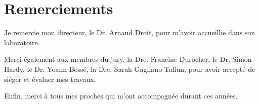 \chapter*{Remerciements}         %

Je remercie mon directeur, le Dr. Arnaud Droit, pour m'avoir accueillie dans son laboratoire.

Merci également aux membres du jury, la Dre. Francine Durocher, le Dr. Simon Hardy, le Dr. Yoann Bossé, la Dre. Sarah Gagliano Taliun, pour avoir accepté de siéger et évaluer mes travaux.

Enfin, merci à tous mes proches qui m'ont accompagnée durant ces années.

